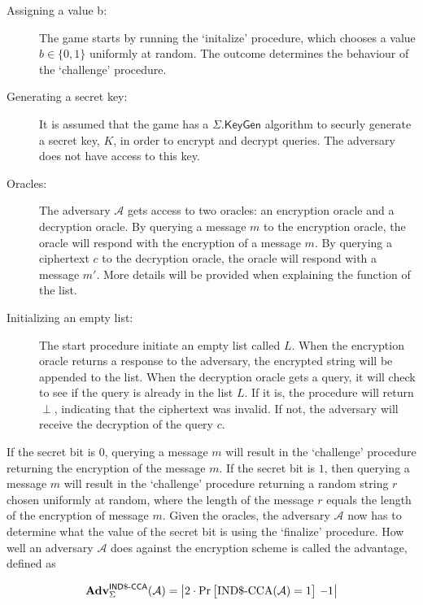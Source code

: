 \begin{description}
\item[Assigning a value b:] The game starts by running the `initalize' procedure, which chooses a value $b \in \{0,1\}$ uniformly at random. The outcome determines the behaviour of the `challenge' procedure.

\item[Generating a secret key:] It is assumed that the game has a $\Sigma.\mathsf{KeyGen}$ algorithm to securly generate a secret key, $K$, in order to encrypt and decrypt queries. The adversary does not have access to this key.

\item[Oracles:] The adversary $\mathcal{A}$ gets access to two oracles: an encryption oracle and a decryption oracle. By querying a message $m$ to the encryption oracle, the oracle will respond with the encryption of a message $m$. By querying a ciphertext $c$ to the decryption oracle, the oracle will respond with a message $m'$. More details will be provided when explaining the function of the list.

\item[Initializing an empty list:] The start procedure initiate an empty list called $L$. When the encryption oracle returns a response to the adversary, the encrypted string will be appended to the list. When the decryption oracle gets a query, it will check to see if the query is already in the list $L$. If it is, the procedure will return $\perp$, indicating that the ciphertext was invalid. If not, the adversary will receive the decryption of the query $c$. 
\end{description}

If the secret bit is $0$, querying a message $m$ will result in the `challenge' procedure returning the encryption of the message $m$. If the secret bit is $1$, then querying a message $m$ will result in the `challenge' procedure returning a random string $r$ chosen uniformly at random, where the length of the message $r$ equals the length of the encryption of message $m$. Given the oracles, the adversary $\mathcal{A}$ now has to determine what the value of the secret bit is using the `finalize' procedure. How well an adversary $\mathcal{A}$ does against the encryption scheme is called the advantage, defined as

\begin{equation*}
\Adv{\Sigma}{IND\$-CCA}{\A} = \left| 2 \cdot \Pr \big[\text{IND\$-CCA} (\mathcal{A}) = 1 \big] \ \minus \ 1\right|
\end{equation*}

